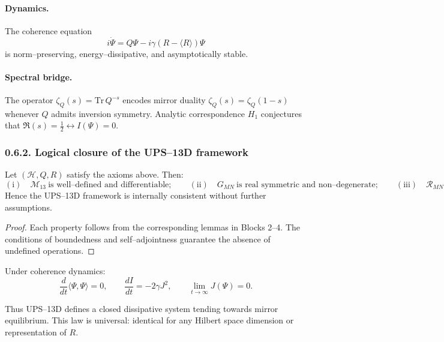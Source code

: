 \paragraph{Dynamics.}
The coherence equation
\[
i\dot\Psi = Q\Psi - i\gamma(R-\langle R\rangle)\Psi
\]
is norm–preserving, energy–dissipative, and asymptotically stable.

\paragraph{Spectral bridge.}
The operator $\zeta_Q(s)=\mathrm{Tr}\,Q^{-s}$ encodes mirror duality
$\zeta_Q(s)=\zeta_Q(1-s)$ whenever $Q$ admits inversion symmetry.
Analytic correspondence $H_1$ conjectures that $\Re(s)=\tfrac12\leftrightarrow I(\Psi)=0$.

\subsubsection*{0.6.2. Logical closure of the UPS–13D framework}

\begin{theorem}
Let $(\mathcal{H},Q,R)$ satisfy the axioms above.
Then:
\[
(\text{i})\quad \mathcal{M}_{13}\ \text{is well–defined and differentiable};
\qquad
(\text{ii})\quad G_{MN}\ \text{is real symmetric and non–degenerate};
\qquad
(\text{iii})\quad \mathcal{R}_{MN}=0\ \Leftrightarrow\ [Q,\partial_M]=0.
\]
\]
Hence the UPS–13D framework is internally consistent without further assumptions.
\end{theorem}

\begin{proof}
Each property follows from the corresponding lemmas in Blocks 2–4.
The conditions of boundedness and self–adjointness guarantee the absence of undefined operations.
\end{proof}

\begin{proposition}
Under coherence dynamics:
\[
\frac{d}{dt}\langle\Psi,\Psi\rangle=0,\qquad
\frac{dI}{dt}=-2\gamma J^2,\qquad
\lim_{t\to\infty}J(\Psi)=0.
\]
\]
\end{proposition}

\begin{remark}
Thus UPS–13D defines a closed dissipative system tending towards mirror equilibrium.
This law is universal: identical for any Hilbert space dimension or representation of $R$.
\end{remark}

